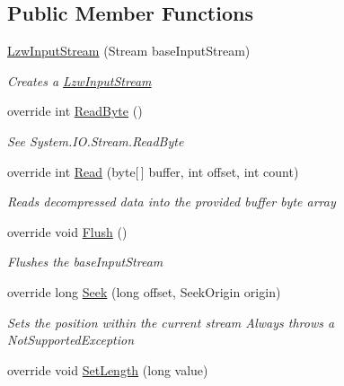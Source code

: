 \subsection*{Public Member Functions}
\begin{DoxyCompactItemize}
\item 
\hyperlink{class_i_c_sharp_code_1_1_sharp_zip_lib_1_1_l_z_w_1_1_lzw_input_stream_a0b2d345fb6423874386e68cf1e13eb93}{Lzw\+Input\+Stream} (Stream base\+Input\+Stream)
\begin{DoxyCompactList}\small\item\em Creates a \hyperlink{class_i_c_sharp_code_1_1_sharp_zip_lib_1_1_l_z_w_1_1_lzw_input_stream}{Lzw\+Input\+Stream} \end{DoxyCompactList}\item 
override int \hyperlink{class_i_c_sharp_code_1_1_sharp_zip_lib_1_1_l_z_w_1_1_lzw_input_stream_a5d86b36649a072ebc29d76c45d7f6e1d}{Read\+Byte} ()
\begin{DoxyCompactList}\small\item\em See System.\+I\+O.\+Stream.\+Read\+Byte \end{DoxyCompactList}\item 
override int \hyperlink{class_i_c_sharp_code_1_1_sharp_zip_lib_1_1_l_z_w_1_1_lzw_input_stream_a46788ca761e790a962bbab1eb18783b6}{Read} (byte\mbox{[}$\,$\mbox{]} buffer, int offset, int count)
\begin{DoxyCompactList}\small\item\em Reads decompressed data into the provided buffer byte array \end{DoxyCompactList}\item 
override void \hyperlink{class_i_c_sharp_code_1_1_sharp_zip_lib_1_1_l_z_w_1_1_lzw_input_stream_a8e4305b522054a69acebca19f556589a}{Flush} ()
\begin{DoxyCompactList}\small\item\em Flushes the base\+Input\+Stream \end{DoxyCompactList}\item 
override long \hyperlink{class_i_c_sharp_code_1_1_sharp_zip_lib_1_1_l_z_w_1_1_lzw_input_stream_a20489eeaf94b06e15c68c3298dba5e26}{Seek} (long offset, Seek\+Origin origin)
\begin{DoxyCompactList}\small\item\em Sets the position within the current stream Always throws a Not\+Supported\+Exception \end{DoxyCompactList}\item 
override void \hyperlink{class_i_c_sharp_code_1_1_sharp_zip_lib_1_1_l_z_w_1_1_lzw_input_stream_a7345d3b1fd3d5c702ecd1f4b0ba247e8}{Set\+Length} (long value)

\end{DoxyCompactItemize}
